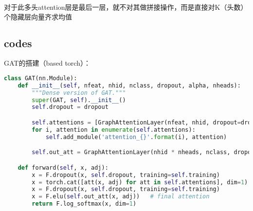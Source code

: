 \documentclass[a4paper]{article}
\begin{document}
对于此多头attention层是最后一层，就不对其做拼接操作，而是直接对K（头数）个隐藏层向量齐求均值
\subsection{codes}
GAT的搭建（based torch）：
\begin{lstlisting}[language=Python, caption=GAT]
    class GAT(nn.Module):
    def __init__(self, nfeat, nhid, nclass, dropout, alpha, nheads):
        """Dense version of GAT."""
        super(GAT, self).__init__()
        self.dropout = dropout

        self.attentions = [GraphAttentionLayer(nfeat, nhid, dropout=dropout, alpha=alpha, concat=True) for _ in range(nheads)]
        for i, attention in enumerate(self.attentions):
            self.add_module('attention_{}'.format(i), attention)

        self.out_att = GraphAttentionLayer(nhid * nheads, nclass, dropout=dropout, alpha=alpha, concat=False)  # 第二层(最后一层)的attention layer

    def forward(self, x, adj):
        x = F.dropout(x, self.dropout, training=self.training)
        x = torch.cat([att(x, adj) for att in self.attentions], dim=1)  # cat hidden vector of every node
        x = F.dropout(x, self.dropout, training=self.training)
        x = F.elu(self.out_att(x, adj))   # final attention
        return F.log_softmax(x, dim=1)
\end{lstlisting}
\end{document}
